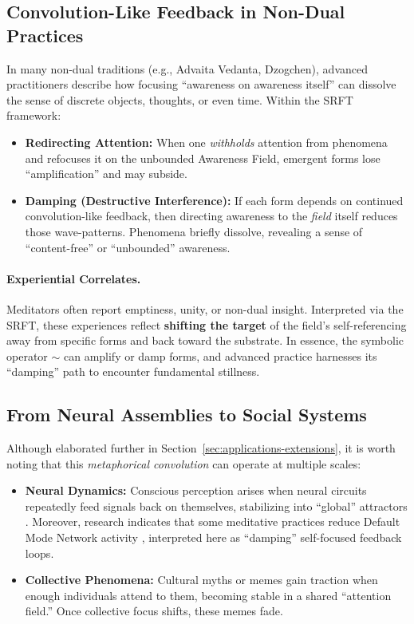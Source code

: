 \documentclass[12pt,a4paper]{article}
\begin{document}
\subsection{Convolution-Like Feedback in Non-Dual Practices}
\label{subsec:nondual-damping}

In many non-dual traditions (e.g., Advaita Vedanta, Dzogchen), advanced practitioners describe how 
focusing “awareness on awareness itself” can dissolve the sense of discrete objects, thoughts, 
or even time. Within the SRFT framework:

\begin{itemize}
    \item \textbf{Redirecting Attention:}
    When one \emph{withholds} attention from phenomena and refocuses it on the unbounded Awareness Field, 
    emergent forms lose “amplification” and may subside.

    \item \textbf{Damping (Destructive Interference):}
    If each form depends on continued convolution-like feedback, then directing awareness 
    to the \emph{field} itself reduces those wave-patterns. Phenomena briefly dissolve, 
    revealing a sense of “content-free” or “unbounded” awareness.
\end{itemize}

\paragraph{Experiential Correlates.}
Meditators often report emptiness, unity, or non-dual insight. Interpreted via the SRFT, these experiences 
reflect \textbf{shifting the target} of the field’s self-referencing away from specific forms 
and back toward the substrate. In essence, the symbolic operator \(\sim\) can amplify or damp forms, 
and advanced practice harnesses its “damping” path to encounter fundamental stillness.

\subsection{From Neural Assemblies to Social Systems}
\label{subsec:convolution-across-scales}

Although elaborated further in Section~\ref{sec:applications-extensions}, it is worth noting 
that this \emph{metaphorical convolution} can operate at multiple scales:

\begin{itemize}
    \item \textbf{Neural Dynamics:} Conscious perception arises when neural circuits repeatedly feed signals back on themselves, stabilizing into “global” attractors \cite{friston2010}. Moreover, research indicates that some meditative practices reduce Default Mode Network activity \cite{brewer2011}, interpreted here as “damping” self-focused feedback loops. 

    \item \textbf{Collective Phenomena:}
    Cultural myths or memes gain traction when enough individuals attend to them, becoming stable 
    in a shared “attention field.” Once collective focus shifts, these memes fade.
\end{itemize}
\end{document}
